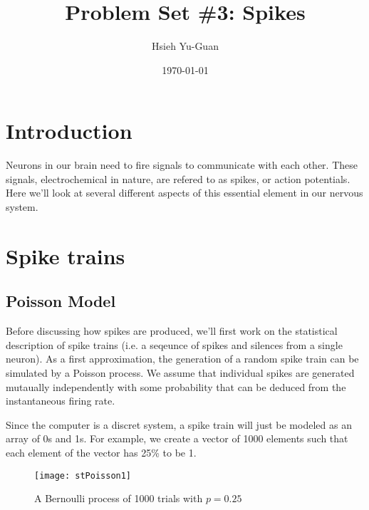 

\pagestyle{fancy} 
\rfoot{\thepage}
\cfoot{}
\lfoot{~\theauthor}
\renewcommand{\headrulewidth}{0.4pt}
\renewcommand{\footrulewidth}{0.4pt}


\title{Problem Set \#3: Spikes \vspace{-0.5em}}
\author{Hsieh Yu-Guan}
\date{\today}
\maketitle

\thispagestyle{fancy}


\section*{Introduction}

Neurons in our brain need to fire signals to communicate with each other. 
These signals, electrochemical in nature, are refered to as spikes, or action
potentials. Here we'll look at several different aspects of this essential
element in our nervous system.


\section{Spike trains}

\subsection{Poisson Model}

Before discussing how spikes are produced, we'll first work on the
statistical description of spike trains (i.e. a seqeunce of spikes and 
silences from a single neuron). As a first approximation, the generation of 
a random spike train can be simulated by a Poisson process. We assume that
individual spikes are generated mutaually independently with some probability 
that can be deduced from the instantaneous firing rate. 

Since the computer is a discret system, a spike train will just be modeled as
an array of 0s and 1s. For example, we create a vector of 1000 elements 
such that each element of the vector has 25\% to be 1.

\begin{figure}[H]
  \centering
  \texttt{[image: stPoisson1]}
  \caption{A Bernoulli process of 1000 trials with $p = 0.25$}
\end{figure}

